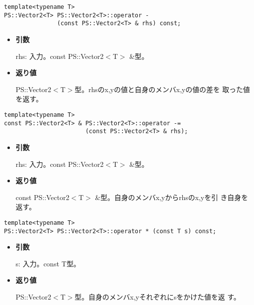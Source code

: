 \begin{screen}
\begin{verbatim}
template<typename T>
PS::Vector2<T> PS::Vector2<T>::operator - 
               (const PS::Vector2<T> & rhs) const;
\end{verbatim}
\end{screen}

\begin{itemize}

\item{{\bf 引数}}

{rhs}: 入力。{const PS::Vector2$<$T$>$ \&}型。

\item{{\bf 返り値}}

{PS::Vector2$<$T$>$}型。{rhs}のx,yの値と自身のメンバx,yの値の差を
取った値を返す。

\end{itemize}

\begin{screen}
\begin{verbatim}
template<typename T>
const PS::Vector2<T> & PS::Vector2<T>::operator -= 
                       (const PS::Vector2<T> & rhs);
\end{verbatim}
\end{screen}

\begin{itemize}

\item{{\bf 引数}}

{rhs}: 入力。{const PS::Vector2$<$T$>$ \&}型。

\item{{\bf 返り値}}

{const PS::Vector2$<$T$>$ \&}型。自身のメンバx,yから{rhs}のx,yを引
き自身を返す。

\end{itemize}


\begin{screen}
\begin{verbatim}
template<typename T>
PS::Vector2<T> PS::Vector2<T>::operator * (const T s) const;
\end{verbatim}
\end{screen}

\begin{itemize}

\item{{\bf 引数}}

{s}: 入力。{const T}型。

\item{{\bf 返り値}}

{PS::Vector2$<$T$>$}型。自身のメンバx,yそれぞれに{s}をかけた値を返
す。

\end{itemize}

